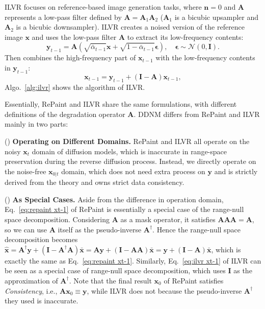 \documentclass{article} \usepackage{iclr2023_conference,times}
\begin{document}
ILVR \citep{choi2021ilvr} focuses on reference-based image generation tasks, where $\mathbf{n}=0$ and $\mathbf{A}$ represents a low-pass filter defined by $\mathbf{A}=\mathbf{A}_1\mathbf{A}_2$ ($\mathbf{A}_1$ is a bicubic upsampler and $\mathbf{A}_2$ is a bicubic downsampler). ILVR creates a noised version of the reference image $\mathbf{x}$ and uses the low-pass filter $\mathbf{A}$ to extract its low-frequency contents:
\begin{equation}
    \mathbf{y}_{t-1} =\mathbf{A}( \sqrt{\bar{\alpha}_{t-1}}\mathbf{x}+\sqrt{1-\bar{\alpha}_{t-1}}\boldsymbol{\epsilon}), \quad \boldsymbol{\epsilon}\sim \mathcal{N}(0,\mathbf{I}).
    \label{eq:ilvr yt-1}
\end{equation}
Then combines the high-frequency part of $\mathbf{x}_{t-1}$ with the low-frequency contents in $\mathbf{y}_{t-1}$:
\begin{equation}
    \mathbf{x}_{t-1} = \mathbf{y}_{t-1} + (\mathbf{I} -\mathbf{A})\mathbf{x}_{t-1},
    \label{eq:ilvr xt-1}
\end{equation}
Algo.~\ref{alg:ilvr} shows the algorithm of ILVR. 

Essentially, RePaint and ILVR share the same formulations, with different definitions of the degradation operator $\mathbf{A}$. DDNM differs from RePaint and ILVR mainly in two parts: 

() \textbf{Operating on Different Domains.} RePaint and ILVR all operate on the noisy $\mathbf{x}_{t}$ domain of diffusion models, which is inaccurate in range-space preservation during the reverse diffusion process. Instead, we directly operate on the noise-free $\mathbf{x}_{0|t}$ domain, which does not need extra process on $\mathbf{y}$ and is strictly derived from the theory and owns strict data consistency. 

() \textbf{As Special Cases.} Aside from the difference in operation domain, Eq.~\ref{eq:repaint xt-1} of RePaint is essentially a special case of the range-null space decomposition. Considering $\mathbf{A}$ as a mask operator, it satisfies $\mathbf{A}\mathbf{A}\mathbf{A}=\mathbf{A}$, so  we can use $\mathbf{A}$ itself as the pseudo-inverse $\mathbf{A}^{\dagger}$. Hence the range-null space decomposition becomes $\hat{\mathbf{x}}=\mathbf{A^{\dagger}}\mathbf{y} + (\mathbf{I} - \mathbf{A^{\dagger}}\mathbf{A})\bar{\mathbf{x}}=\mathbf{A}\mathbf{y} + (\mathbf{I} - \mathbf{A}\mathbf{A})\bar{\mathbf{x}}=\mathbf{y} + (\mathbf{I} - \mathbf{A})\bar{\mathbf{x}}$, which is exactly the same as Eq.~\ref{eq:repaint xt-1}. Similarly, Eq.~\ref{eq:ilvr xt-1} of ILVR can be seen as a special case of range-null space decomposition, which uses $\mathbf{I}$ as the approximation of $\mathbf{A}^{\dagger}$. Note that the final result $\mathbf{x}_{0}$ of RePaint satisfies \textit{Consistency}, i.e., $\mathbf{A}\mathbf{x}_0\equiv\mathbf{y}$, while ILVR does not because the pseudo-inverse $\mathbf{A}^{\dagger}$ they used is inaccurate.   
\end{document}
